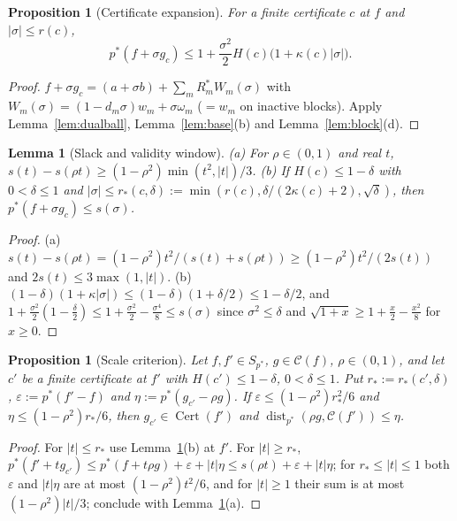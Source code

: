 \documentclass[10pt]{amsart}
\newtheorem{lemma}[theorem]{Lemma}
\newtheorem{proposition}[theorem]{Proposition}
\theoremstyle{definition}
\theoremstyle{remark}
\newcommand{\dist}{\operatorname{dist}}
\newcommand{\Cset}{\mathcal C}
\newcommand{\Cert}{\operatorname{Cert}}
\begin{document}
\begin{proposition}[Certificate expansion]\label{prop:expansion}
For a finite certificate $c$ at $f$ and $|\sigma|\le r(c)$,
\[
 p^*(f+\sigma g_c)\le1+\frac{\sigma^2}2H(c)\big(1+\kappa(c)|\sigma|\big).
\]
\end{proposition}

\begin{proof}
$f+\sigma g_c=(a+\sigma b)+\sum_mR_m^*W_m(\sigma)$ with
$W_m(\sigma)=(1-d_m\sigma)w_m+\sigma\omega_m$ ($=w_m$ on inactive blocks).
Apply Lemma~\ref{lem:dualball}, Lemma~\ref{lem:base}(b) and
Lemma~\ref{lem:block}(d).
\end{proof}

\begin{lemma}[Slack and validity window]\label{lem:slack}
\textup{(a)} For $\rho\in(0,1)$ and real $t$,
$s(t)-s(\rho t)\ge(1-\rho^2)\min(t^2,|t|)/3$.
\textup{(b)} If $H(c)\le1-\delta$ with $0<\delta\le1$ and
$|\sigma|\le r_*(c,\delta):=\min(r(c),\delta/(2\kappa(c)+2),\sqrt\delta)$,
then $p^*(f+\sigma g_c)\le s(\sigma)$.
\end{lemma}

\begin{proof}
(a) $s(t)-s(\rho t)=(1-\rho^2)t^2/(s(t)+s(\rho t))\ge(1-\rho^2)t^2/(2s(t))$
and $2s(t)\le3\max(1,|t|)$.  (b) $(1-\delta)(1+\kappa|\sigma|)\le
(1-\delta)(1+\delta/2)\le1-\delta/2$, and $1+\frac{\sigma^2}2(1-\frac\delta
2)\le1+\frac{\sigma^2}2-\frac{\sigma^4}8\le s(\sigma)$ since
$\sigma^2\le\delta$ and $\sqrt{1+x}\ge1+\frac x2-\frac{x^2}8$ for $x\ge0$.
\end{proof}

\begin{proposition}[Scale criterion]\label{prop:scale}
Let $f,f'\in S_{p^*}$, $g\in\Cset(f)$, $\rho\in(0,1)$, and let $c'$ be a
finite certificate at $f'$ with $H(c')\le1-\delta$, $0<\delta\le1$.  Put
$r_*:=r_*(c',\delta)$, $\varepsilon:=p^*(f'-f)$ and
$\eta:=p^*(g_{c'}-\rho g)$.  If $\varepsilon\le(1-\rho^2)r_*^2/6$ and
$\eta\le(1-\rho^2)r_*/6$, then $g_{c'}\in\Cert(f')$ and
$\dist_{p^*}(\rho g,\Cset(f'))\le\eta$.
\end{proposition}

\begin{proof}
For $|t|\le r_*$ use Lemma~\ref{lem:slack}(b) at $f'$.  For $|t|\ge r_*$,
$p^*(f'+tg_{c'})\le p^*(f+t\rho g)+\varepsilon+|t|\eta\le
s(\rho t)+\varepsilon+|t|\eta$; for $r_*\le|t|\le1$ both $\varepsilon$
and $|t|\eta$ are at most $(1-\rho^2)t^2/6$, and for $|t|\ge1$ their sum
is at most $(1-\rho^2)|t|/3$; conclude with Lemma~\ref{lem:slack}(a).
\end{proof}
\end{document}
